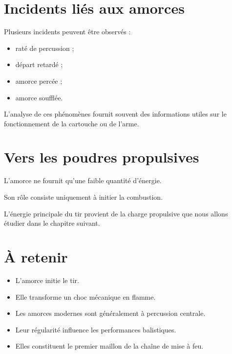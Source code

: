 \section{Incidents liés aux amorces}

Plusieurs incidents peuvent être observés :

\begin{itemize}
    \item raté de percussion ;
    \item départ retardé ;
    \item amorce percée ;
    \item amorce soufflée.
\end{itemize}

L'analyse de ces phénomènes fournit souvent des informations utiles sur le
fonctionnement de la cartouche ou de l'arme.

\section{Vers les poudres propulsives}

L'amorce ne fournit qu'une faible quantité d'énergie.

Son rôle consiste uniquement à initier la combustion.

L'énergie principale du tir provient de la charge propulsive que nous allons
étudier dans le chapitre suivant.

\section{À retenir}

\begin{aretenir}

\begin{itemize}
    \item L'amorce initie le tir.
    \item Elle transforme un choc mécanique en flamme.
    \item Les amorces modernes sont généralement à percussion centrale.
    \item Leur régularité influence les performances balistiques.
    \item Elles constituent le premier maillon de la chaîne de mise à feu.
\end{itemize}

\end{aretenir}
